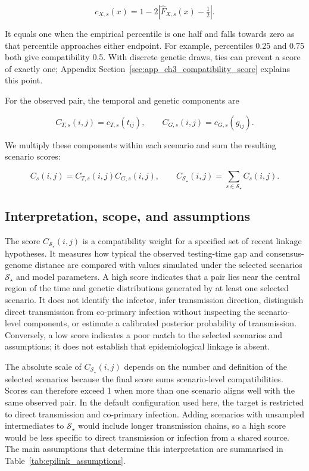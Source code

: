 \[
    c_{X,s}(x)=1-2\left|\widehat F_{X,s}(x)-\tfrac{1}{2}\right|.
\]

It equals one when the empirical percentile is one half and falls towards zero as that percentile approaches either endpoint. For example, percentiles 0.25 and 0.75 both give compatibility 0.5. With discrete genetic draws, ties can prevent a score of exactly one; Appendix Section~\ref{sec:app_ch3_compatibility_score} explains this point.

For the observed pair, the temporal and genetic components are

\[
    C_{T,s}(i,j)=c_{T,s}(t_{ij}),
    \qquad C_{G,s}(i,j)=c_{G,s}(g_{ij}).
\]

We multiply these components within each scenario and sum the resulting scenario scores:

\[
    C_s(i,j)=C_{T,s}(i,j)C_{G,s}(i,j),
    \qquad
    C_{\mathcal{S}_\star}(i,j)=\sum_{s\in\mathcal{S}_\star}C_s(i,j).
\]

\subsection{Interpretation, scope, and assumptions}\label{sec:ch3_epilink_interpretation}

The score $C_{\mathcal{S}_\star}(i,j)$ is a compatibility weight for a specified set of recent linkage hypotheses. It measures how typical the observed testing-time gap and consensus-genome distance are compared with values simulated under the selected scenarios $\mathcal{S}_\star$ and model parameters. A high score indicates that a pair lies near the central region of the time and genetic distributions generated by at least one selected scenario. It does not identify the infector, infer transmission direction, distinguish direct transmission from co-primary infection without inspecting the scenario-level components, or estimate a calibrated posterior probability of transmission. Conversely, a low score indicates a poor match to the selected scenarios and assumptions; it does not establish that epidemiological linkage is absent.

The absolute scale of $C_{\mathcal{S}_\star}(i,j)$ depends on the number and definition of the selected scenarios because the final score sums scenario-level compatibilities. Scores can therefore exceed 1 when more than one scenario aligns well with the same observed pair. In the default configuration used here, the target is restricted to direct transmission and co-primary infection. Adding scenarios with unsampled intermediates to $\mathcal{S}_\star$ would include longer transmission chains, so a high score would be less specific to direct transmission or infection from a shared source. The main assumptions that determine this interpretation are summarised in Table~\ref{tab:epilink_assumptions}.

